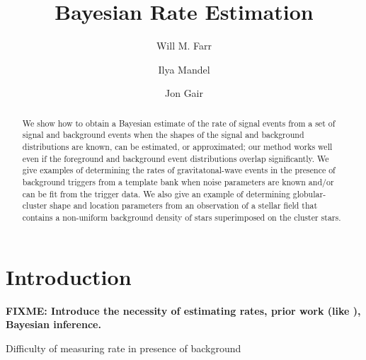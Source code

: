 \documentclass[aps,prd]{revtex4-1}
\newcommand{\fixme}[1]{\textbf{FIXME: #1}}
\begin{document}
\title{Bayesian Rate Estimation}

\author{Will M. Farr}

\author{Ilya Mandel}

\author{Jon Gair}

\begin{abstract}
  We show how to obtain a Bayesian estimate of the rate of signal
  events from a set of signal and background events when the shapes of
  the signal and background distributions are known, can be estimated,
  or approximated; our method works well even if the foreground and
  background event distributions overlap significantly.  We give
  examples of determining the rates of gravitatonal-wave events in
  the presence of background triggers from a template bank when noise
  parameters are known and/or can be fit from the trigger data.  We
  also give an example of determining globular-cluster shape and
  location parameters from an observation of a stellar field that
  contains a non-uniform background density of stars superimposed on
  the cluster stars.
\end{abstract}

\maketitle

\section{Introduction}

\fixme{Introduce the necessity of estimating rates, prior work (like
  \cite{Biswas2009}), Bayesian inference.}
  
Difficulty of measuring rate in presence of background
\end{document}
